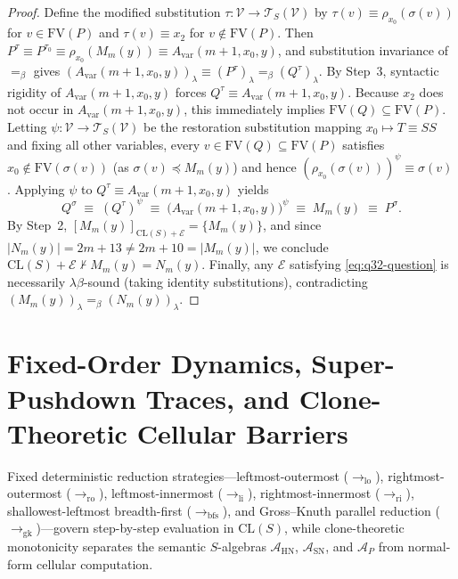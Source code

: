 \documentclass[11pt,reqno]{amsart}
\numberwithin{equation}{section}
\theoremstyle{plain}
\theoremstyle{definition}
\theoremstyle{remark}
\newcommand{\CLS}{\mathrm{CL}(S)}
\newcommand{\TSV}{\mathcal{T}_S(\mathcal{V})}
\begin{document}
\begin{proof}
Define the modified substitution $\tau \colon \mathcal{V} \to \TSV$ by $\tau(v) \equiv \rho_{x_0}(\sigma(v))$ for $v \in \mathrm{FV}(P)$ and $\tau(v) \equiv x_2$ for $v \notin \mathrm{FV}(P)$. Then $P^\tau \equiv P^{\tau_0} \equiv \rho_{x_0}(M_m(y)) \equiv A_{\mathrm{var}}(m + 1, x_0, y)$, and substitution invariance of $=_\beta$ gives $(A_{\mathrm{var}}(m + 1, x_0, y))_\lambda \equiv (P^\tau)_\lambda =_\beta (Q^\tau)_\lambda$. By Step~3, syntactic rigidity of $A_{\mathrm{var}}(m + 1, x_0, y)$ forces $Q^\tau \equiv A_{\mathrm{var}}(m + 1, x_0, y)$. Because $x_2$ does not occur in $A_{\mathrm{var}}(m + 1, x_0, y)$, this immediately implies $\mathrm{FV}(Q) \subseteq \mathrm{FV}(P)$. Letting $\psi \colon \mathcal{V} \to \TSV$ be the restoration substitution mapping $x_0 \mapsto T \equiv S S$ and fixing all other variables, every $v \in \mathrm{FV}(Q) \subseteq \mathrm{FV}(P)$ satisfies $x_0 \notin \mathrm{FV}(\sigma(v))$ (as $\sigma(v) \preceq M_m(y)$) and hence $(\rho_{x_0}(\sigma(v)))^\psi \equiv \sigma(v)$. Applying $\psi$ to $Q^\tau \equiv A_{\mathrm{var}}(m + 1, x_0, y)$ yields
\[
  Q^\sigma \;\equiv\; (Q^\tau)^\psi \;\equiv\; \bigl(A_{\mathrm{var}}(m + 1, x_0, y)\bigr)^\psi \;\equiv\; M_m(y) \;\equiv\; P^\sigma.
\]
By Step~2, $[M_m(y)]_{\CLS + \mathcal{E}} = \{M_m(y)\}$, and since $|N_m(y)| = 2m + 13 \ne 2m + 10 = |M_m(y)|$, we conclude $\CLS + \mathcal{E} \nvdash M_m(y) = N_m(y)$. Finally, any $\mathcal{E}$ satisfying \eqref{eq:q32-question} is necessarily $\lambda\beta$-sound (taking identity substitutions), contradicting $(M_m(y))_\lambda =_\beta (N_m(y))_\lambda$.
\end{proof}

\section{Fixed-Order Dynamics, Super-Pushdown Traces, and Clone-Theoretic Cellular Barriers}
\label{sec:fixed-cellular}

Fixed deterministic reduction strategies---leftmost-outermost ($\to_{\mathrm{lo}}$), rightmost-outermost ($\to_{\mathrm{ro}}$), leftmost-innermost ($\to_{\mathrm{li}}$), rightmost-innermost ($\to_{\mathrm{ri}}$), shallowest-leftmost breadth-first ($\to_{\mathrm{bfs}}$), and Gross--Knuth parallel reduction ($\to_{\mathrm{gk}}$)---govern step-by-step evaluation in $\mathrm{CL}(S)$, while clone-theoretic monotonicity separates the semantic $S$-algebras $\mathcal{A}_{\mathrm{HN}}$, $\mathcal{A}_{\mathrm{SN}}$, and $\mathcal{A}_P$ from normal-form cellular computation.
\end{document}
